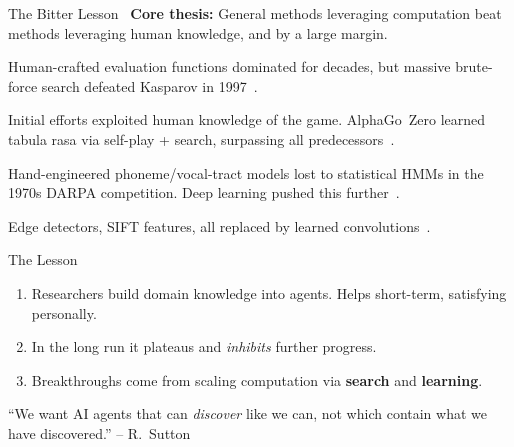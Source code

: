 \begin{frame}{The Bitter Lesson~\cite{sutton2019bitter}}
  \textbf{Core thesis:} General methods leveraging computation beat methods leveraging human knowledge, and by a large margin.

  \begin{description}[style=nextline]
    \item[Chess] Human-crafted evaluation functions dominated for decades, but massive brute-force search defeated Kasparov in 1997~\cite{campbell2002deep}.
    \item[Go] Initial efforts exploited human knowledge of the game. AlphaGo~Zero learned tabula rasa via self-play + search, surpassing all predecessors~\cite{silver2017mastering}.
    \item[Speech] Hand-engineered phoneme/vocal-tract models lost to statistical HMMs in the 1970s DARPA competition. Deep learning pushed this further~\cite{hinton2012deep}.
    \item[Vision] Edge detectors, SIFT features, all replaced by learned convolutions~\cite{krizhevsky2012imagenet}.
  \end{description}

  \begin{alertblock}{The Lesson}
    \begin{enumerate}
      \item Researchers build domain knowledge into agents. Helps short-term, satisfying personally.
      \item In the long run it plateaus and \emph{inhibits} further progress.
      \item Breakthroughs come from scaling computation via \textbf{search} and \textbf{learning}.
    \end{enumerate}
  \end{alertblock}

  \vspace{0.3em}
  {\small ``We want AI agents that can \emph{discover} like we can, not which contain what we have discovered.'' -- R.~Sutton}
\end{frame}

